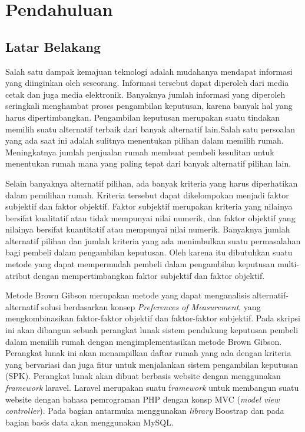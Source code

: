 \chapter{Pendahuluan}
\label{chap:intro}
   
\section{Latar Belakang}
\label{sec:label}

Salah satu dampak kemajuan teknologi adalah mudahanya mendapat informasi yang diinginkan oleh seseorang. Informasi tersebut dapat diperoleh dari media cetak dan juga media elektronik. Banyaknya jumlah informasi yang diperoleh seringkali menghambat proses pengambilan keputusan, karena banyak hal yang harus dipertimbangkan. Pengambilan keputusan merupakan suatu tindakan memilih suatu alternatif terbaik dari banyak alternatif lain.Salah satu persoalan yang ada saat ini adalah sulitnya menentukan pilihan dalam memilih rumah. Meningkatnya jumlah penjualan rumah membuat pembeli kesulitan untuk menentukan rumah mana yang paling tepat dari banyak alternatif pilihan lain.

Selain banyaknya alternatif pilihan, ada banyak kriteria yang harus diperhatikan dalam pemilihan rumah. Kriteria tersebut dapat dikelompokan menjadi faktor subjektif dan faktor objektif.
Faktor subjektif merupakan kriteria yang nilainya bersifat kualitatif atau tidak mempunyai nilai numerik, dan faktor objektif yang nilainya bersifat kuantitatif atau mempunyai nilai numerik.
Banyaknya jumlah alternatif pilihan dan jumlah kriteria yang ada menimbulkan suatu permasalahan bagi pembeli dalam pengambilan keputusan. Oleh karena itu dibutuhkan suatu metode yang dapat mempermudah pembeli dalam pengambilan keputusan multi-atribut dengan mempertimbangkan faktor subjektif dan faktor objektif. 

Metode Brown Gibson merupakan metode yang dapat menganalisis alternatif-alternatif solusi berdasarkan konsep \textit{Preferences of Measurement}, yang mengkombinasikan faktor-faktor objektif dan faktor-faktor subjektif.
Pada skripsi ini akan dibangun sebuah perangkat lunak sistem pendukung keputusan pembeli dalam memilih rumah  dengan mengimplementasikan metode Brown Gibson. Perangkat lunak ini akan menampilkan daftar  rumah yang ada dengan kriteria yang bervariasi dan juga fitur untuk menjalankan sistem pengambilan keputusan (SPK).
Perangkat lunak  akan dibuat berbasis website dengan menggunakan \textit{framework} laravel. Laravel merupakan suatu f\textit{ramework} untuk membangun suatu website dengan bahasa pemrograman PHP dengan konsp MVC (\textit{model view controller}). Pada bagian antarmuka menggunakan \textit{library} Boostrap dan pada bagian basis data akan menggunakan MySQL.



